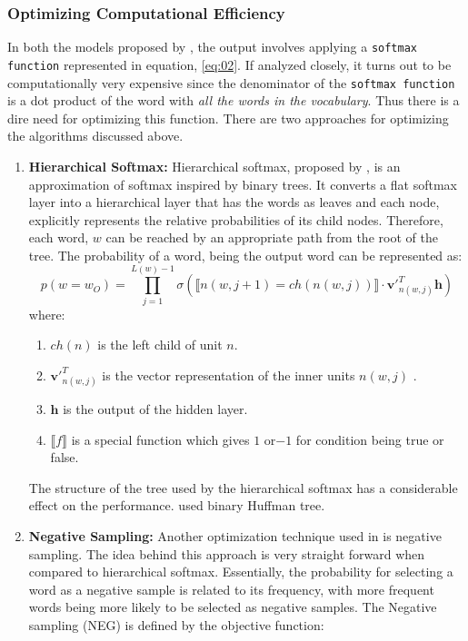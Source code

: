 \subsubsection{Optimizing Computational Efficiency}
In both the models proposed by \cite{mikolov2013efficient}, the output involves applying a \texttt{softmax function} represented in equation, \ref{eq:02}. If analyzed closely, it turns out to be computationally very expensive since the denominator of the \texttt{softmax function} is a dot product of the word with \textit{all the words in the vocabulary}. Thus there is a dire need for optimizing this function.
There are two approaches for optimizing the algorithms discussed above.
\begin{enumerate}
	\item \textbf{Hierarchical Softmax: }
	Hierarchical softmax, proposed by \cite{morin2005hierarchical}, is an approximation of softmax inspired by binary trees. It converts a flat softmax layer into a hierarchical layer that has the words as leaves and each node, explicitly represents the relative probabilities of its child nodes. Therefore, each word, $\textit{w}$ can be reached by an appropriate path from the root of the tree. The probability of a word, being the output word can be represented as:
	\begin{equation}
	p(w = w_O) = \prod_{j=1}^{L(w)-1} \sigma(\llbracket n(w,j+1) = ch(n(w,j))\rrbracket \cdot \mathbf{v'}^T_{n(w,j)}\mathbf{h})
	\end{equation}
	where:
	\begin{enumerate}
		\item $ch(n)$ is the left child of unit $n$.
		\item $\mathbf{v'}^T_{n(w,j)}$ is the vector representation of the inner units $n(w,j)$ .
		\item $\mathbf{h}$ is the output of the hidden layer.
		\item $\llbracket f\rrbracket$ is a special function which gives $1$ or$-1$ for condition being true or false. 
	\end{enumerate}
	The structure of the tree used by the hierarchical softmax has a considerable effect on the performance. \cite{mikolov2013distributed} used binary Huffman tree.
	\item \textbf{Negative Sampling: }
	Another optimization technique used in \cite{mikolov2013distributed} is negative sampling. The idea behind this approach is very straight forward when compared to hierarchical softmax. Essentially, the probability for selecting a word as a negative sample is related to its frequency, with more frequent words being more likely to be selected as negative samples. The Negative sampling (NEG) is defined by the objective function:

\end{enumerate}
